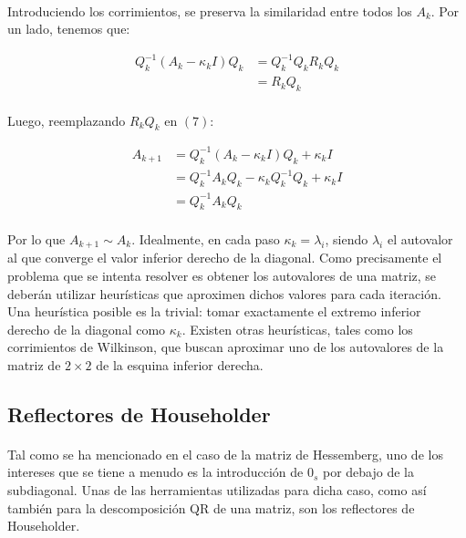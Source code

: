 \documentclass[12pt, twocolumn]{article}
\begin{document}
	\paragraph{} Introduciendo los corrimientos, se preserva la similaridad entre todos los $A_{k}$. Por un lado, tenemos que:
	
	\begin{align}
		Q_{k}^{-1}(A_{k} - \kappa_{k}I)Q_{k} &= Q_{k}^{-1}Q_{k}R_{k}Q_{k}  \\ &= R_{k}Q_{k}
	\end{align}
	
	\paragraph{} Luego, reemplazando $R_{k}Q_{k}$ en $(7)$:
	
	\begin{align}
		A_{k+1} &= Q_{k}^{-1}(A_{k} - \kappa_{k}I)Q_{k} + \kappa_{k}I \\ &= Q_{k}^{-1}A_{k}Q_{k} - \kappa_{k}Q_{k}^{-1}Q_{k} + \kappa_{k}I  \\ &= Q_{k}^{-1}A_{k}Q_{k}  
	\end{align}
	
	\paragraph{} Por lo que $A_{k+1} \sim A_{k}$. Idealmente, en cada paso $\kappa_{k} = \lambda_{i}$, siendo $\lambda_{i}$ el autovalor al que converge el valor inferior derecho de la diagonal. Como precisamente el problema que se intenta resolver es obtener los autovalores de una matriz, se deberán utilizar heurísticas que aproximen dichos valores para cada iteración. Una heurística posible es la trivial: tomar exactamente el extremo inferior derecho de la diagonal como $\kappa_{k}$. Existen otras heurísticas, tales como los corrimientos de Wilkinson, que buscan aproximar uno de los autovalores de la matriz de $2\times2$ de la esquina inferior derecha.
	
	\subsection{Reflectores de Householder}
	
	\paragraph{} Tal como se ha mencionado en el caso de la matriz de Hessemberg, uno de los intereses que se tiene a menudo es la introducción de $0_{s}$ por debajo de la subdiagonal. Unas de las herramientas utilizadas para dicha caso, como así también para la descomposición QR de una matriz, son los reflectores de Householder.
	
\end{document}
